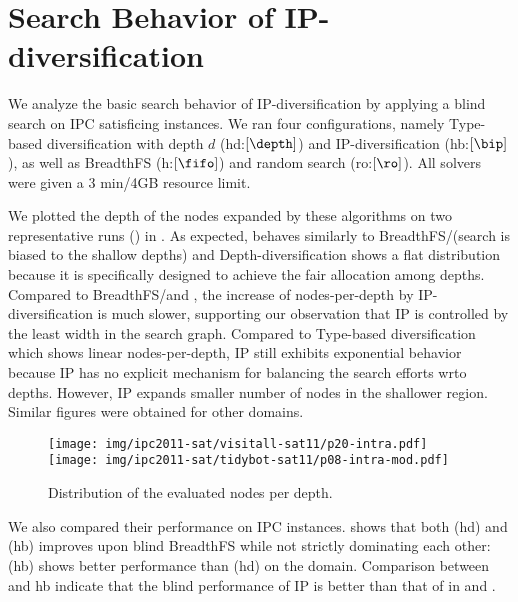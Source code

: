 \section{Search Behavior of IP-diversification}

We analyze the basic search behavior of IP-diversification by applying a blind search on IPC satisficing instances.
We ran four configurations, namely Type-based diversification with depth $d$ (hd:$[\depth]$) and IP-diversification (hb:$[\bip]$), as well as BreadthFS (h:$[\fifo]$) and random search (ro:$[\ro]$).
All solvers were given a 3 min/4GB resource limit.

We plotted the depth of the nodes expanded by these algorithms on two representative runs () in .
As expected, \ro behaves similarly to BreadthFS/\fifo (search is biased to the shallow depths) and
Depth-diversification shows a flat distribution because it is specifically designed to achieve the fair allocation among depths.
Compared to BreadthFS/\fifo and \ro, the increase of nodes-per-depth by IP-diversification is much slower, supporting our observation that IP is controlled by the least width in the search graph.
Compared to Type-based diversification which shows linear nodes-per-depth, IP still exhibits exponential behavior because IP has no explicit mechanism for balancing  the search  efforts wrto depths. However, IP expands smaller number of nodes in the shallower region.
Similar figures were obtained for other domains.

\begin{figure}
 \texttt{[image: img/ipc2011-sat/visitall-sat11/p20-intra.pdf]}
 \texttt{[image: img/ipc2011-sat/tidybot-sat11/p08-intra-mod.pdf]}
 \caption{Distribution of the evaluated nodes per depth.}
 \label{fig:distribution}
\end{figure}

We also compared their performance on IPC instances.
 shows that both (hd) and (hb) improves upon blind BreadthFS while 
not strictly dominating each other: (hb) shows better performance than
(hd) on the  domain.
Comparison between \ro and hb indicate that the blind performance of IP is better than that of \ro in  and .

